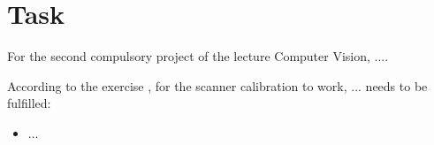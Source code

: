 \chapter{Task}
For the second compulsory project of the lecture Computer Vision, ....

According to the exercise \cite{cv_lecture_ex}, for the scanner calibration to work, ... needs to be fulfilled:
\begin{itemize}
    \item ...
\end{itemize}
